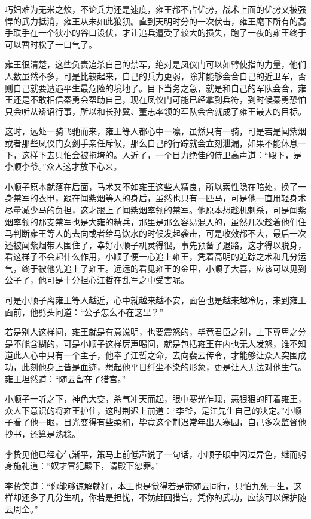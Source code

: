 巧妇难为无米之炊，不论兵力还是速度，雍王都不占优势，战术上面的优势又被强悍的武力抵消，雍王从未如此狼狈。直到天明时分的一次伏击，雍王麾下所有的高手联手在一个狭小的谷口设伏，才让追兵遭受了较大的损失，跑了一夜的雍王终于可以暂时松了一口气了。

雍王很清楚，这些负责追杀自己的禁军，绝对是凤仪门可以如臂使指的力量，他们人数虽然不多，可是比较起来，自己的兵力更弱，除非能够会合自己的近卫军，否则自己就要遭遇平生最危险的境地了。目下当务之急，就是和自己的军队会合，雍王还是不敢相信秦勇会帮助自己，现在凤仪门可能已经拿到兵符，到时候秦勇恐怕只会听从矫诏行事，所以和长孙冀、董志率领的军队会合就成了雍王最大的目标。

这时，远处一骑飞驰而来，雍王等人都心中一凛，虽然只有一骑，可是若是闻紫烟或者那些凤仪门女剑手亲任斥候，那么自己的行踪就会立刻泄漏，如果不能休息一下，这样下去只怕会被拖垮的。人近了，一个目力绝佳的侍卫高声道：“殿下，是李顺李爷。”众人这才放下心来。

小顺子原本就落在后面，马术又不如雍王这些人精良，所以索性隐在暗处，换了一身禁军的衣甲，跟在闻紫烟等人的身后，虽然也只有一匹马，可是他一直用轻身术尽量减少马的负担，这才跟上了闻紫烟率领的禁军。他原本想趁机刺杀，可是闻紫烟率领的那支禁军也是大雍的精兵，那里是那么容易混入的，虽然几次趁着他们住马判断雍王等人的去向或者给马饮水的时候发起袭击，可是收效都不大，最后一次还被闻紫烟带人围住了，幸好小顺子机灵得很，事先预备了退路，这才得以脱身，看这样子不会起什么作用，小顺子便一心追上雍王，凭着高明的追踪之术和几分运气，终于被他先追上了雍王。远远的看见雍王的金甲，小顺子大喜，应该可以见到公子了，他可是十分担心江哲在乱军之中受害呢。

可是小顺子离雍王等人越近，心中就越来越不安，面色也是越来越冷厉，来到雍王面前，他劈头问道：“公子怎么不在这里？”

若是别人这样问，雍王就是有意说明，也要震怒的，毕竟君臣之别，上下尊卑之分是不能含糊的，可是小顺子这样厉声喝问，就是包括雍王在内也无人发怒，谁不知道此人心中只有一个主子，他奉了江哲之命，去向裴云传令，才能够让众人突围成功，此刻他身上皆是血迹，想起他平日纤尘不染的形象，更是让人无法对他生气。雍王坦然道：“随云留在了猎宫。”

小顺子一听之下，神色大变，杀气冲天而起，眼中寒光乍现，恶狠狠的盯着雍王，众人下意识的将雍王护住，这时荆迟上前道：“李爷，是江先生自己的决定。”小顺子看了他一眼，目光变得有些柔和，毕竟这个荆迟常年出入寒园，自己多次监督他抄书，还算是熟稔。

李贽见他已经心气渐平，策马上前低声说了一句话，小顺子眼中闪过异色，继而躬身施礼道：“奴才冒犯殿下，请殿下恕罪。”

李贽笑道：“你能够谅解就好，本王也是觉得若是带随云同行，只怕九死一生，这样却还多了几分生机，你若是担忧，不妨赶回猎宫，凭你的武功，应该可以保护随云周全。”

